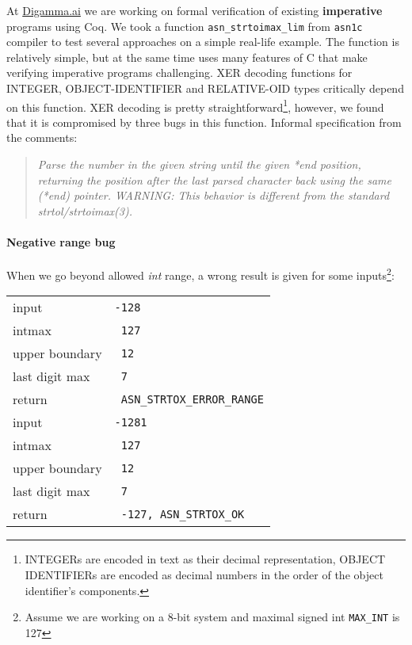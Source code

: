 \documentclass{article}
\begin{document}
  At \url{Digamma.ai} we are working on formal verification of existing {\bf imperative} programs using Coq. We took a function \texttt{asn\_strtoimax\_lim} from \texttt{asn1c} compiler to test several approaches on a simple real-life example. The function is relatively simple, but at the same time uses many features of C that make verifying imperative programs challenging. XER decoding functions for INTEGER, OBJECT-IDENTIFIER and RELATIVE-OID types critically depend on this function. XER decoding is pretty straightforward\footnote{INTEGERs are encoded in text as their decimal representation, OBJECT IDENTIFIERs are encoded as decimal numbers in the order of the object identifier's components.}, however, we found that it is compromised by three bugs in this function.
    Informal specification from the comments: 
  \begin{quote}

 { \it Parse the number in the given string until the given *end position,
 returning the position after the last parsed character back using the
 same (*end) pointer.
 WARNING: This behavior is different from the standard strtol/strtoimax(3). }
\end{quote}
  
  {\fontsize{8}{4}\selectfont  }
  \skip
  
\paragraph{Negative range bug}

When we go beyond allowed \textit{int} range, a wrong result is given for some inputs\footnote{Assume we are working on a 8-bit system and maximal signed int \texttt{MAX\_INT} is 127}:

\skip
\begin{tabular}{|l|l|}
 \hline
input & \texttt{-128} \\
intmax & \texttt{\ 127}\\
upper boundary& \texttt{\ 12} \\
last digit max& \texttt{\ 7}\\
return & \color{green}\texttt{\ ASN\_STRTOX\_ERROR\_RANGE}\\
\hline 
input & \texttt{-1281} \\
intmax & \texttt{\ 127}\\
upper boundary& \texttt{\ 12} \\
last digit max& \texttt{\ 7}\\
return & \color{red}\texttt{\ -127, ASN\_STRTOX\_OK}\\
\hline
    \end{tabular}
\end{document}
